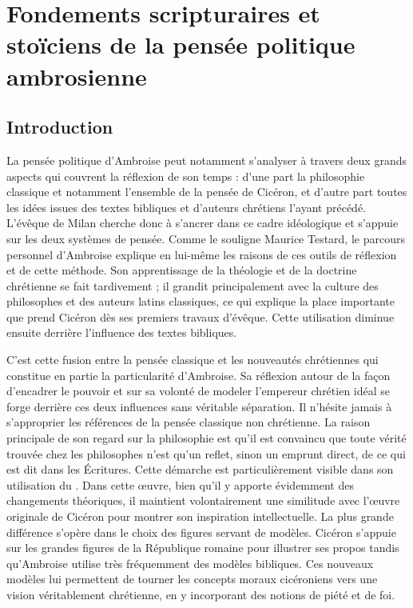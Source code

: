 \section{Fondements scripturaires et stoïciens de la pensée politique ambrosienne}

\subsection*{Introduction}

La pensée politique d'Ambroise peut notamment s'analyser à travers deux grands aspects qui couvrent la réflexion de son temps : d'une part la philosophie classique et notamment l'ensemble de la pensée de Cicéron, et d'autre part toutes les idées issues des textes bibliques et d'auteurs chrétiens l'ayant précédé. L'évêque de Milan cherche donc à s'ancrer dans ce cadre idéologique et s'appuie sur les deux systèmes de pensée. Comme le souligne Maurice Testard, le parcours personnel d'Ambroise explique en lui-même les raisons de ces outils de réflexion et de cette méthode. Son apprentissage de la théologie et de la doctrine chrétienne se fait tardivement ; il grandit principalement avec la culture des philosophes et des auteurs latins classiques, ce qui explique la place importante que prend Cicéron dès ses premiers travaux d'évêque. Cette utilisation diminue ensuite derrière l'influence des textes bibliques\autocite[373]{testard_ambroise_1992}.

\bigskip

C'est cette fusion entre la pensée classique et les nouveautés chrétiennes qui constitue en partie la particularité d'Ambroise. Sa réflexion autour de la façon d'encadrer le pouvoir et sur sa volonté de modeler l'empereur chrétien idéal se forge derrière ces deux influences sans véritable séparation. Il n'hésite jamais à s'approprier les références de la pensée classique non chrétienne. La raison principale de son regard sur la philosophie est qu'il est convaincu que toute vérité trouvée chez les philosophes n'est qu'un reflet, sinon un emprunt direct, de ce qui est dit dans les Écritures\autocite{muckle_officiis}. Cette démarche est particulièrement visible dans son utilisation du . Dans cette œuvre, bien qu'il y apporte évidemment des changements théoriques, il maintient volontairement une similitude avec l'œuvre originale de Cicéron pour montrer son inspiration intellectuelle. La plus grande différence s'opère dans le choix des figures servant de modèles. Cicéron s'appuie sur les grandes figures de la République romaine pour illustrer ses propos tandis qu'Ambroise utilise très fréquemment des modèles bibliques. Ces nouveaux modèles lui permettent de tourner les concepts moraux cicéroniens vers une vision véritablement chrétienne, en y incorporant des notions de piété et de foi.

